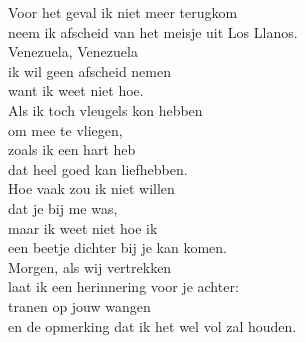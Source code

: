 \begin{translation}
Voor het geval ik niet meer terugkom\\
neem ik afscheid van het meisje uit Los Llanos.\\
Venezuela, Venezuela\\
ik wil geen afscheid nemen\\
want ik weet niet hoe.\\\vspace{1em}
Als ik toch vleugels kon hebben\\
om mee te vliegen,\\
zoals ik een hart heb\\
dat heel goed kan liefhebben.\\\vspace{1em}
Hoe vaak zou ik niet willen\\
dat je bij me was,\\
maar ik weet niet hoe ik\\
een beetje dichter bij je kan komen.\\\vspace{1em}
Morgen, als wij vertrekken\\
laat ik een herinnering voor je achter:\\
tranen op jouw wangen\\
en de opmerking dat ik het wel vol zal houden. \\
\end{translation}